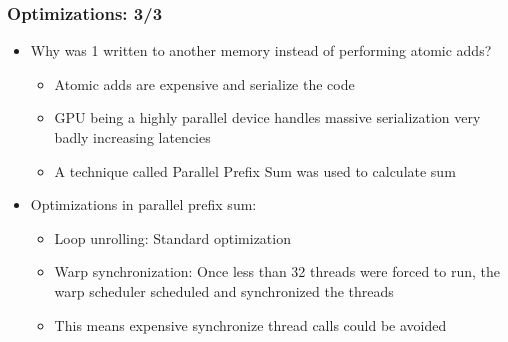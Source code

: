 \documentclass[mathserif]{beamer}
\begin{document}
\begin{frame}                                                                                                                                                                          
\frametitle{Optimizations: 3/3}
\begin{itemize}
\item Why was 1 written to another memory instead of performing atomic adds? 
\begin{itemize}
\item Atomic adds are expensive and serialize the code 
\item GPU being a highly parallel device handles massive serialization very badly increasing latencies 
\item A technique called Parallel Prefix Sum was used to calculate sum
\end{itemize}
\item Optimizations in parallel prefix sum:  
\begin{itemize}
\item Loop unrolling: Standard optimization 
\item Warp synchronization: Once less than 32 threads were forced to run, the warp scheduler scheduled and synchronized the threads 
\item This means expensive synchronize thread calls could be avoided
\end{itemize}
\end{itemize}
\end{frame}              
\end{document}
